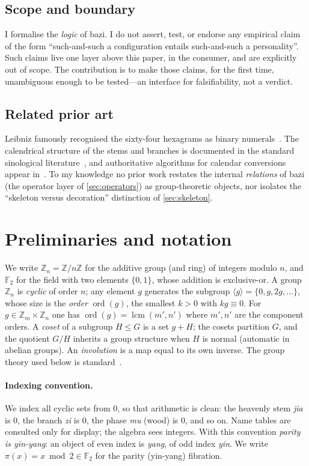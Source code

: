 \documentclass[11pt,a4paper]{article}
\theoremstyle{definition}
\theoremstyle{remark}
\DeclareMathOperator{\lcm}{lcm}
\newcommand{\Z}{\mathbb{Z}}
\newcommand{\F}{\mathbb{F}}
\newcommand{\ord}{\operatorname{ord}}
\begin{document}
\subsection{Scope and boundary}
I formalise the \emph{logic} of bazi. I do not assert, test, or endorse any empirical claim of the form ``such-and-such a configuration entails such-and-such a personality''. Such claims live one layer above this paper, in the consumer, and are explicitly out of scope. The contribution is to make those claims, for the first time, unambiguous enough to be tested---an interface for falsifiability, not a verdict.

\subsection{Related prior art}
Leibniz famously recognised the sixty-four hexagrams as binary numerals~\cite{leibniz1703}. The calendrical structure of the stems and branches is documented in the standard sinological literature~\cite{smith2008,needham1959}, and authoritative algorithms for calendar conversions appear in~\cite{dershowitz}. To my knowledge no prior work restates the internal \emph{relations} of bazi (the operator layer of \cref{sec:operators}) as group-theoretic objects, nor isolates the ``skeleton versus decoration'' distinction of \cref{sec:skeleton}.

\section{Preliminaries and notation}\label{sec:prelim}

We write $\Z_n=\Z/n\Z$ for the additive group (and ring) of integers modulo $n$, and $\F_2$ for the field with two elements $\{0,1\}$, whose addition is exclusive-or. A group $\Z_n$ is \emph{cyclic} of order $n$; any element $g$ generates the subgroup $\langle g\rangle=\{0,g,2g,\dots\}$, whose size is the \emph{order} $\ord(g)$, the smallest $k>0$ with $kg\equiv 0$. For $g\in\Z_m\times\Z_n$ one has $\ord(g)=\lcm(m',n')$ where $m',n'$ are the component orders. A \emph{coset} of a subgroup $H\le G$ is a set $g+H$; the cosets partition $G$, and the quotient $G/H$ inherits a group structure when $H$ is normal (automatic in abelian groups). An \emph{involution} is a map equal to its own inverse. The group theory used below is standard~\cite{dummitfoote}.

\paragraph{Indexing convention.} We index all cyclic sets from $0$, so that arithmetic is clean: the heavenly stem \emph{jia} is $0$, the branch \emph{zi} is $0$, the phase \emph{mu} (wood) is $0$, and so on. Name tables are consulted only for display; the algebra sees integers. With this convention \emph{parity is yin-yang}: an object of even index is \emph{yang}, of odd index \emph{yin}. We write $\pi(x)=x\bmod 2\in\F_2$ for the parity (yin-yang) fibration.
\end{document}
